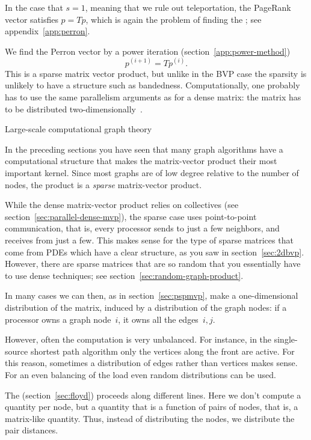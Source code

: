 In the case that $s=1$, meaning that we rule out teleportation, the
PageRank vector satisfies $p=Tp$, which is again the problem of
finding the ; see appendix~\ref{app:perron}.

We find the Perron vector by a power iteration (section~\ref{app:power-method})
\[ p^{(i+1)} = T p^{(i)}. \]
This is a sparse matrix vector product, but unlike in the \ac{BVP}
case the sparsity is unlikely to have a structure such as
bandedness. Computationally, one probably has to use the same
parallelism arguments as for a dense matrix: the matrix has to be
distributed two-dimensionally~\cite{OgAi:sparsestorage}.


 {Large-scale computational graph theory}
\label{sec:random-graph-product}

In the preceding sections you have seen that many graph algorithms
have a computational structure that makes the matrix-vector product
their most important kernel. Since most graphs are of low degree 
relative to the number of nodes, the product is a \emph{sparse}
matrix-vector product.

While the dense matrix-vector product relies on collectives
(see section~\ref{sec:parallel-dense-mvp}),
the sparse case uses point-to-point communication, that is,
every processor sends to just a few neighbors, and receives
from just a few.
This makes sense for the type of sparse matrices
that come from \acp{PDE}
which have a clear structure, as you saw 
in section~\ref{sec:2dbvp}. However, there are 
sparse matrices that are so random that you essentially
have to use dense techniques; see
section~\ref{sec:random-graph-product}.

In many cases we can then, as in section~\ref{sec:pspmvp},
make a one-dimensional distribution of the matrix,
induced by a distribution of the graph nodes: if a processor
owns a graph node~$i$, it owns all the edges~$i,j$.

However, often the computation is very unbalanced. For instance,
in the single-source shortest path algorithm only the vertices
along the front are active. For this reason, sometimes a distribution
of edges rather than vertices makes sense. For an even balancing
of the load even random distributions can be used.

The 
(section~\ref{sec:floyd}) proceeds along different lines. Here we don't
compute a quantity per node, but a quantity that is a function of pairs
of nodes, that is, a matrix-like quantity. Thus, instead of distributing
the nodes, we distribute the pair distances.

